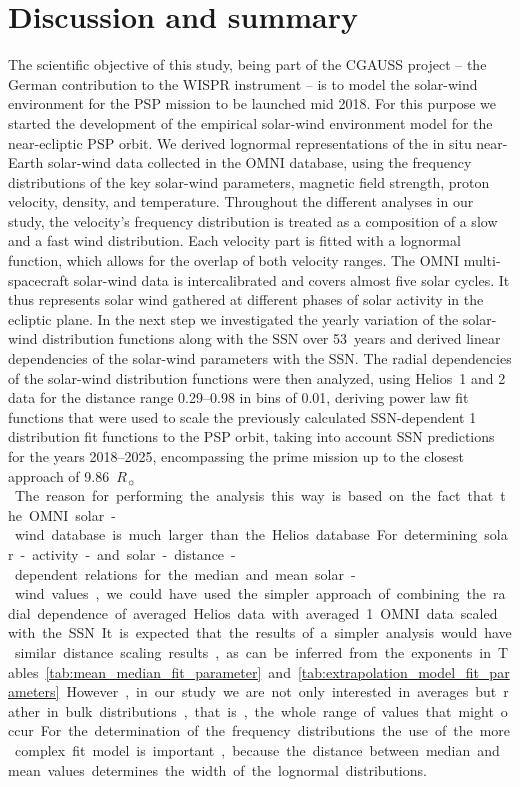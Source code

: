 \documentclass[]{aa}
\newcommand{\Rs}{$R_\sun{}$}
\begin{document}
        \section{Discussion and summary}
        \label{sec:discussion_and_summary}
        The scientific objective of this study, being part of the CGAUSS project -- the German contribution to the WISPR instrument -- is to model the solar-wind environment for the PSP mission to be launched mid 2018. For this purpose we started the development of the empirical solar-wind environment model for the near-ecliptic PSP orbit. We derived lognormal representations of the in situ near-Earth solar-wind data collected in the OMNI database, using the frequency distributions of the key solar-wind parameters, magnetic field strength, proton velocity, density, and temperature. Throughout the different analyses in our study, the velocity's frequency distribution is treated as a composition of a slow and a fast wind distribution. Each velocity part is fitted with a lognormal function, which allows for the overlap of both velocity ranges. The OMNI multi-spacecraft solar-wind data is intercalibrated and covers almost five solar cycles. It thus represents solar wind gathered at different phases of solar activity in the ecliptic plane. In the next step we investigated the yearly variation of the solar-wind distribution functions along with the SSN over 53~years and derived linear dependencies of the solar-wind parameters with the SSN. The radial dependencies of the solar-wind distribution functions were then analyzed, using Helios~1 and 2 data for the distance range \SIrange{0.29}{0.98}{\au} in bins of \SI{0.01}{\au}, deriving power law fit functions that were used to scale the previously calculated SSN-dependent \SI{1}{\au} distribution fit functions to the PSP orbit, taking into account SSN predictions for the years 2018--2025, encompassing the prime mission up to the closest approach of \SI{9.86}{\Rs}. The reason for performing the analysis this way is based on the fact that the OMNI solar-wind database is much larger than the Helios database.

        For determining solar-activity- and solar-distance-dependent relations for the median and mean solar-wind values, we could have used the simpler approach of combining the radial dependence of averaged Helios data with averaged \SI{1}{\au} OMNI data scaled with the SSN. It is expected that the results of a simpler analysis would have similar distance scaling results, as can be inferred from the exponents in Tables~\ref{tab:mean_median_fit_parameter} and \ref{tab:extrapolation_model_fit_parameters}. However, in our study we are not only interested in averages but rather in bulk distributions, that is, the whole range of values that might occur. For the determination of the frequency distributions the use of the more complex fit model is important, because the distance between median and mean values determines the width of the lognormal distributions.
\end{document}
